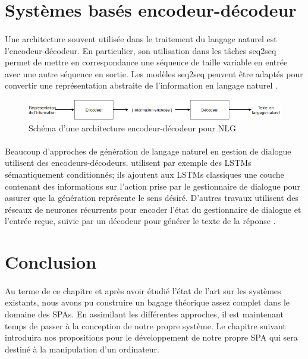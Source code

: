 \section{Systèmes basés encodeur-décodeur}
\paragraph{}
Une architecture souvent utilisée dans le traitement du langage naturel est l'encodeur-décodeur. En particulier, son utilisation dans les tâches seq2seq permet de mettre en correspondance une séquence de taille variable en entrée avec une autre séquence en sortie. Les modèles seq2seq peuvent être adaptés pour convertir une représentation abstraite de l'information en langage naturel \citep {Ferreira2017}.\newline
\begin{figure}[H]
	\centering
	\includegraphics[width=.95\linewidth]{images/NLG/Encoder.png} 
	\caption{Schéma d'une architecture encodeur-décodeur pour NLG} 
\end{figure}
\paragraph{}
Beaucoup d'approches de génération de langage naturel en gestion de dialogue utilisent des encodeurs-décodeurs. \cite{Wen2015} utilisent par exemple des LSTMs sémantiquement conditionnés; ils ajoutent aux LSTMs classiques une couche contenant des informations sur l'action prise par le gestionnaire de dialogue pour assurer que la génération représente le sens désiré. D'autres travaux utilisent des réseaux de neurones récurrents pour encoder l'état du gestionnaire de dialogue et l'entrée reçue, suivie par un décodeur pour générer le texte de la réponse \citep{Sordoni2015,Serban2016,Goyal2016}.
\section{Conclusion}
\paragraph{}
Au terme de ce chapitre et après avoir étudié l'état de l'art sur les systèmes existants, nous avons pu construire un bagage théorique assez complet dans le domaine des SPAs. En assimilant les différentes approches, il est maintenant temps de passer à la conception de notre propre système. Le chapitre suivant introduira nos propositions pour le développement de notre propre SPA qui sera destiné à la manipulation d'un ordinateur.